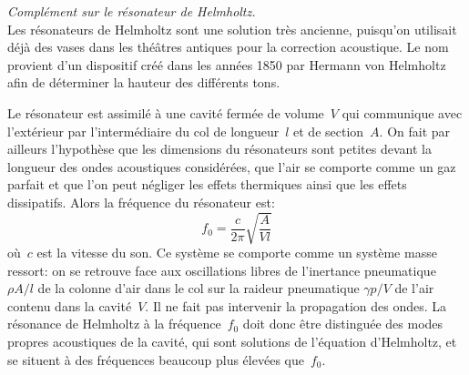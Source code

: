 \begin{histoire}
\emph{Complément sur le résonateur de Helmholtz.}\\
Les résonateurs de Helmholtz sont une solution très ancienne, puisqu'on utilisait déjà des vases dans les théâtres antiques pour la correction acoustique. Le nom provient d'un dispositif créé dans les années 1850 par Hermann von Helmholtz afin de déterminer la hauteur des différents tons. 

\medskip
{}

Le résonateur est assimilé à une cavité fermée de volume~$V$ qui communique avec l'extérieur par l'intermédiaire du col de longueur~$l$ et de section~$A$. On fait par ailleurs l'hypothèse que les dimensions du résonateurs sont petites devant la longueur des ondes acoustiques considérées, que l'air se comporte comme un gaz parfait et que l'on peut négliger les effets thermiques ainsi que les effets dissipatifs. Alors la fréquence du résonateur est:
\begin{equation}
f_0 = \frac{c}{2 \pi} \sqrt{\frac{A}{V l}}
\end{equation}
où~$c$ est la vitesse du son. Ce système se comporte comme un système masse ressort: on se retrouve face aux oscillations libres de l'inertance pneumatique ${\rho A}/{l}$ de la colonne d'air dans le col sur la raideur pneumatique ${\gamma p}/{V}$ de l'air contenu dans la cavité~$V$. Il ne fait pas intervenir la propagation des ondes. La résonance de Helmholtz à la fréquence~$f_0$ doit donc être distinguée des modes propres acoustiques de la cavité, qui sont solutions de l'équation d'Helmholtz, et se situent à des fréquences beaucoup plus élevées que~$f_0$.
\end{histoire}

